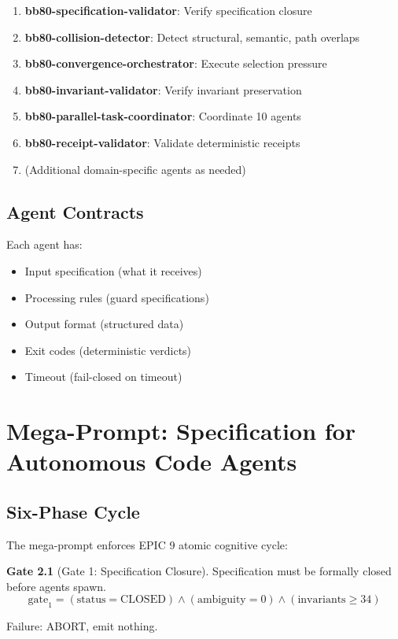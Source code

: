 \documentclass[12pt,oneside,a4paper]{book}
\theoremstyle{definition}
\newtheorem{gate}{Gate}[chapter]
\begin{document}
\begin{enumerate}
  \item \textbf{bb80-specification-validator}: Verify specification closure
  \item \textbf{bb80-collision-detector}: Detect structural, semantic, path overlaps
  \item \textbf{bb80-convergence-orchestrator}: Execute selection pressure
  \item \textbf{bb80-invariant-validator}: Verify invariant preservation
  \item \textbf{bb80-parallel-task-coordinator}: Coordinate 10 agents
  \item \textbf{bb80-receipt-validator}: Validate deterministic receipts
  \item (Additional domain-specific agents as needed)
\end{enumerate}

\section{Agent Contracts}
\label{sec:agent-contracts}

Each agent has:
\begin{itemize}
  \item Input specification (what it receives)
  \item Processing rules (guard specifications)
  \item Output format (structured data)
  \item Exit codes (deterministic verdicts)
  \item Timeout (fail-closed on timeout)
\end{itemize}

\chapter{Mega-Prompt: Specification for Autonomous Code Agents}
\label{ch:mega-prompt}


\section{Six-Phase Cycle}
\label{sec:mega-prompt-phases}

The mega-prompt enforces EPIC 9 atomic cognitive cycle:

\begin{gate}[Gate 1: Specification Closure]
Specification must be formally closed before agents spawn.
$$\text{gate}_1 = (\text{status} = \text{CLOSED}) \land (\text{ambiguity} = 0) \land (\text{invariants} \geq 34)$$

Failure: ABORT, emit nothing.
\end{gate}
\end{document}
